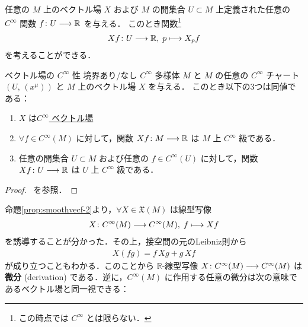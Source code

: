 \documentclass[TQFT_main]{subfiles}
\begin{document}
任意の $M$ 上のベクトル場 $X$ および $M$ の開集合 $U \subset M$ 上定義された任意の $C^\infty$ 関数 $f \colon U \longrightarrow \mathbb{R}$ を与える．
このとき関数\footnote{この時点では $C^\infty$ とは限らない．}
\begin{align}
    Xf \colon U \longrightarrow \mathbb{R},\; p \longmapsto X_p f
\end{align}
を考えることができる．

\begin{myprop}[label=prop:smoothvecf-2]{ベクトル場の $C^\infty$ 性}
    境界あり/なし $C^\infty$ 多様体 $M$ と $M$ の任意の $C^\infty$ チャート $(U,\, (x^\mu))$ と $M$ 上のベクトル場 $X$ を与える．
    このとき以下の3つは同値である：
    \begin{enumerate}
        \item $X$ は\hyperref[def:vecf]{$C^\infty$ ベクトル場}
        \item $\forall f \in C^\infty (M)$ に対して，関数 $Xf \colon M \longrightarrow \mathbb{R}$ は $M$ 上 $C^\infty$ 級である．
        \item 任意の開集合 $U \subset M$ および任意の $f \in C^\infty (U)$ に対して，関数 $Xf \colon U \longrightarrow \mathbb{R}$ は $U$ 上 $C^\infty$ 級である．
    \end{enumerate}
    
\end{myprop}

\begin{proof}
    ~\cite[p.180, Proposition 8.14]{Lee2012smooth}を参照．
\end{proof}

命題\ref{prop:smoothvecf-2}より，$\forall X \in \mathfrak{X}(M)$ は線型写像
\begin{align}
    X \colon C^\infty (M) \longrightarrow C^\infty(M),\; f \longmapsto Xf
\end{align}
を誘導することが分かった．その上，接空間の元のLeibniz則から
\begin{align}
    X(fg) = f\, Xg + g\, Xf
\end{align}
が成り立つこともわかる．このことから $\mathbb{R}$-線型写像 $X \colon C^\infty (M) \longrightarrow C^\infty(M)$ は\textbf{微分} (derivation) である．逆に，$C^\infty(M)$ に作用する任意の微分は次の意味であるベクトル場と同一視できる：
\end{document}
